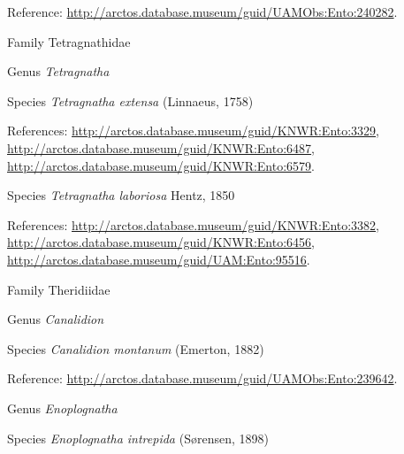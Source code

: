 \documentclass[9pt, article]{memoir}
\begin{document}
\begin{multicols}{2}
\vspace{6pt}Reference: 
\url{http://arctos.database.museum/guid/UAMObs:Ento:240282}.

\vspace{6pt}\noindent\hspace{24pt}Family Tetragnathidae


\vspace{6pt}\noindent\hspace{30pt}Genus \textit{Tetragnatha}


\vspace{6pt}\noindent\hspace{36pt}Species \textit{Tetragnatha extensa} (Linnaeus, 1758)


\vspace{6pt}References: 
\url{http://arctos.database.museum/guid/KNWR:Ento:3329}, 
\url{http://arctos.database.museum/guid/KNWR:Ento:6487}, 
\url{http://arctos.database.museum/guid/KNWR:Ento:6579}.

\vspace{6pt}\noindent\hspace{36pt}Species \textit{Tetragnatha laboriosa} Hentz, 1850


\vspace{6pt}References: 
\url{http://arctos.database.museum/guid/KNWR:Ento:3382}, 
\url{http://arctos.database.museum/guid/KNWR:Ento:6456}, 
\url{http://arctos.database.museum/guid/UAM:Ento:95516}.

\vspace{6pt}\noindent\hspace{24pt}Family Theridiidae


\vspace{6pt}\noindent\hspace{30pt}Genus \textit{Canalidion}


\vspace{6pt}\noindent\hspace{36pt}Species \textit{Canalidion montanum} (Emerton, 1882)


\vspace{6pt}Reference: 
\url{http://arctos.database.museum/guid/UAMObs:Ento:239642}.

\vspace{6pt}\noindent\hspace{30pt}Genus \textit{Enoplognatha}


\vspace{6pt}\noindent\hspace{36pt}Species \textit{Enoplognatha intrepida} (Sørensen, 1898)



\end{multicols}
\end{document}
